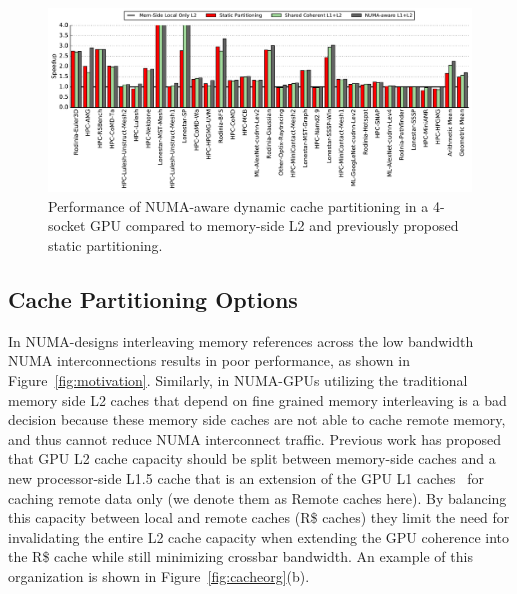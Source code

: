 \begin{figure}[t]
    \centering
    \includegraphics[width=1.0\textwidth]{figures/plot_merged_cache_WB.pdf}
    \caption{Performance of NUMA-aware dynamic cache partitioning in a 4-socket
	GPU compared to memory-side L2 and previously proposed static partitioning.}
    \label{fig:dynamiccaching}
        \vspace{-.2in}
\end{figure}

\subsection{Cache Partitioning Options}
In NUMA-designs interleaving memory references across the low bandwidth NUMA 
interconnections results in poor performance, as shown in 
Figure~\ref{fig:motivation}. Similarly, in NUMA-GPUs utilizing the 
traditional memory side L2 caches that depend on fine grained memory 
interleaving is a bad decision because these memory side caches are not able 
to cache remote memory, and thus cannot reduce NUMA interconnect traffic.  
Previous work has proposed that GPU L2 cache capacity should be split between 
memory-side caches and a new processor-side L1.5 cache that is an extension 
of the GPU L1 caches~\cite{Arunkumar2017} for caching remote data only (we 
denote them as Remote caches here). By balancing this capacity between local 
and remote caches (R\$ caches) they limit the need for invalidating the entire 
L2 cache capacity when extending the GPU coherence into the R\$ cache while still 
minimizing crossbar bandwidth. An example of this organization is shown in 
Figure~\ref{fig:cacheorg}(b). 

